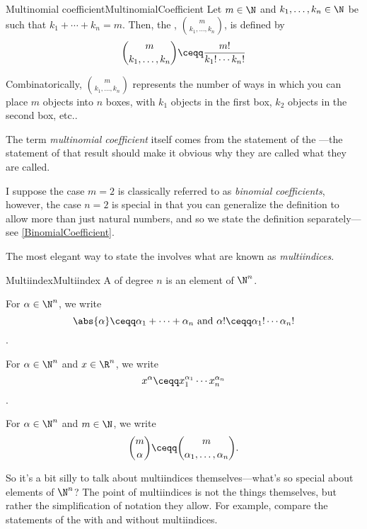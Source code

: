 \begin{dfn}{Multinomial coefficient}{MultinomialCoefficient}
Let $m\in \N$ and $k_1,\ldots ,k_n\in \N$ be such that $k_1+\cdots +k_n=m$.  Then, the , $\binom{m}{k_1,\ldots ,k_n}$, is defined by
\begin{equation}\label{eqn6.4.110}
\binom{m}{k_1,\ldots ,k_n}\ceqq \frac{m!}{k_1!\cdots k_n!}
\end{equation}
\begin{rmk}
Combinatorically, $\binom{m}{k_1,\ldots ,k_n}$ represents the number of ways in which you can place $m$ objects into $n$ boxes, with $k_1$ objects in the first box, $k_2$ objects in the second box, etc..
\end{rmk}
\begin{rmk}
The term \emph{multinomial coefficient} itself comes from the statement of the ---the statement of that result should make it obvious why they are called what they are called.
\end{rmk}
\begin{rmk}
I suppose the case $m=2$ is classically referred to as \emph{binomial coefficients}, however, the case $n=2$ is special in that you can generalize the definition to allow more than just natural numbers, and so we state the definition separately---see \cref{BinomialCoefficient}.
\end{rmk}
\end{dfn}
The most elegant way to state the  involves what are known as \emph{multiindices}.
\begin{dfn}{Multiindex}{Multiindex}
A  of degree $n$ is an element of $\N ^n$.

For $\alpha \in \N ^n$, we write
\begin{equation}
\abs{\alpha}\ceqq \alpha _1+\cdots +\alpha _n\text{ and }\alpha !\ceqq \alpha _1!\cdots \alpha _n!
\end{equation}\index[notation]{$\abs{\alpha}$}.

For $\alpha \in \N ^n$ and $x\in \R ^n$, we write
\begin{equation}
x^\alpha \ceqq x_1^{\alpha _1}\cdots x_n^{\alpha _n}
\end{equation}.

For $\alpha \in \N ^n$ and $m\in \N$, we write
\begin{equation}
\binom{m}{\alpha}\ceqq \binom{m}{\alpha _1,\ldots ,\alpha _n}.
\end{equation}
\begin{rmk}
So it's a bit silly to talk about multiindices themselves---what's so special about elements of $\N ^n$?  The point of multiindices is not the things themselves, but rather the simplification of notation they allow.  For example, compare the statements of the  with and without multiindices.
\end{rmk}
\end{dfn}

